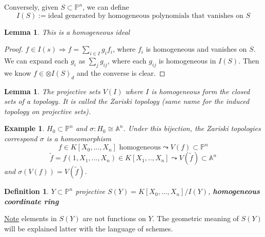 \documentclass[11pt]{article}
\newtheorem{lemma}[thm]{Lemma}
\newtheorem{dfn}[thm]{Definition}
\newtheorem{ex}[thm]{Example}
\newcommand{\affn}{\mathbb A}
\newcommand{\proj}{\mathbb P}
\newcommand{\Lrta}{\Longrightarrow}
\begin{document}
Conversely, given $S\subset \proj^n$, we can define 
$$
I(S):=\text{ideal generated by homogeneous polynomials that vanishes on $S$}
$$
\begin{lemma}
This is a homogeneous ideal
\end{lemma}
\begin{proof}
$f\in I(s)\Lrta f=\sum_{i\in I}g_i f_i$, where $f_i$ is homogeneous and vanishes on $S$. We can expand each $g_i$ as $\sum_j g_{ij}$, where each $g_{ij}$ is homogeneous in $I(S)$. Then we know $f\in \otimes I(S)_d$ and the converse is clear.
\end{proof}
\begin{lemma}
The projective sets $V(I)$ where $I$ is homogeneous form the closed sets of a topology. It is called the Zariski topology (same name for the induced topology on projective sets).
\end{lemma}
\begin{ex}
$H_0\subset \proj^n$ and $\sigma: H_0\cong \affn^n$. Under this bijection, the Zariski topologies correspond $\sigma $ is a homeomorphism
$$
f\in K[X_0,...,X_n]\text{ homogeneous} \leadsto V(f)\subset \proj^n
$$
$$
\tilde{f}=f(1,X_1,...,X_n)\in K[X_1,..,X_n]\leadsto V(\tilde{f})\subset \affn^n
$$
and $\sigma(V(f))=V(\tilde{f})$.
\end{ex}
\begin{dfn}
$Y\subset \proj^n$ projective $S(Y)=K[X_0,...,X_n]/I(Y)$, \textbf{homogeneous coordinate ring}
\end{dfn}
\underline{Note} elements in $S(Y)$ are not functions on $Y$. The geometric meaning of $S(Y)$ will be explained latter with the language of schemes.
\end{document}
